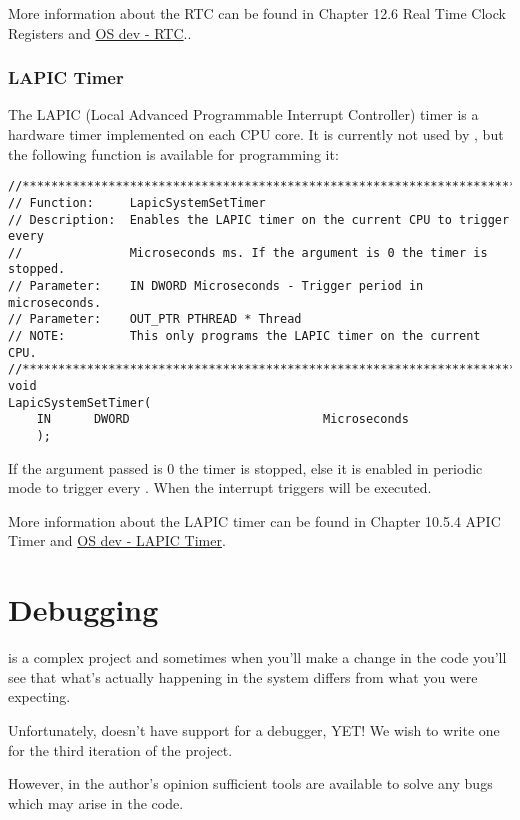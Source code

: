 \begin{appendices}
More information about the RTC can be found in \cite{intelPch} Chapter 12.6 Real Time Clock Registers and 
\href{http://wiki.osdev.org/RTC}{OS dev - RTC}..

\subsection{LAPIC Timer}

The LAPIC (Local Advanced Programmable Interrupt Controller) timer is a hardware timer implemented on each CPU core.
It is currently not used by \projectname, but the following function is available for programming it:
\begin{lstlisting}[caption={LAPIC Timer},label={lst:LapicTimer}]
//******************************************************************************
// Function:     LapicSystemSetTimer
// Description:  Enables the LAPIC timer on the current CPU to trigger every
//               Microseconds ms. If the argument is 0 the timer is stopped.
// Parameter:    IN DWORD Microseconds - Trigger period in microseconds.
// Parameter:    OUT_PTR PTHREAD * Thread
// NOTE:         This only programs the LAPIC timer on the current CPU.
//******************************************************************************
void
LapicSystemSetTimer(
    IN      DWORD                           Microseconds
    );
\end{lstlisting}

If the argument passed is 0 the timer is stopped, else it is enabled in periodic mode to trigger every .
When the interrupt triggers  will be executed.

More information about the LAPIC timer can be found in \cite{intelSys} Chapter 10.5.4 APIC Timer and
\href{http://wiki.osdev.org/APIC_timer}{OS dev - LAPIC Timer}.

\chapter{Debugging}
\label{chap:Debugging}

\projectname is a complex project and sometimes when you'll make a change in the code you'll see
that what's actually happening in the system differs from what you were expecting.

Unfortunately, \projectname doesn't have support for a debugger, YET! We wish to write one for the
third iteration of the project.

However, in the author's opinion sufficient tools are available to solve any bugs which may arise
in the code.


\end{appendices}

